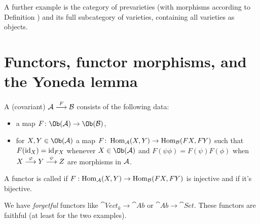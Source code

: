 \documentclass[a4paper,parskip=half,numbers=enddot, DIV=12]{scrreprt}
\begin{document}
  A further example is the category of prevarieties (with morphisms according to Definition ) and its full subcategory of varieties, containing all varieties as objects.
    
\section{Functors, functor morphisms, and the Yoneda lemma}
  \begin{defi}
  	A (covariant)  $\Aa\morphism[F]\Bb$ consists of the following data:
  	\begin{itemize}
  		\item a map $F\colon \Ob(\Aa)\to\Ob(\Bb)$,
  		\item for $X,Y\in\Ob(\Aa)$ a map $F\colon\operatorname{Hom}_{\mathcal{A}}(X,Y)\to\operatorname{Hom}_{\mathcal{B}}(FX,FY)$ such that $F(\operatorname{id}_X)=\operatorname{id}_{FX}$ whenever $X\in\Ob(\Aa)$ and $F(\psi\phi)=F(\psi)F(\phi)$ when $X\morphism[\phi]Y\morphism[\psi]Z$ are morphisms in $\mathcal{A}$.
  	\end{itemize}
  	A functor is called  if $F:\operatorname{Hom}_{\mathcal{A}}(X,Y)\to\operatorname{Hom}_{\mathcal{B}}(FX,FY)$ is injective and  if it's bijective.
  \end{defi}
    
  
  \begin{example*}
  	We have \emph{forgetful} functors like $\cat{Vect}_k\to\cat{Ab}$ or $\cat{Ab}\to\cat{Set}$. These functors are faithful (at least for the two examples).
  \end{example*}
  
\end{document}
